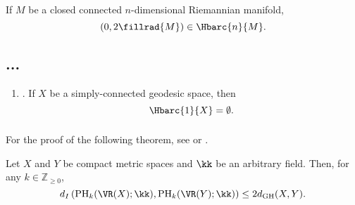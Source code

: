 \begin{proposition}\label{prop:manifold}
	If $M$ be a closed connected $n$-dimensional Riemannian manifold,
	\[
	(0,2\fillrad{M}) \in \Hbarc{n}{M}.
	\]
\end{proposition}

\subsection{...}

\begin{enumerate}

	\item\label{prop:pH1} {\rm \cite[Prop.~7.10]{virk20201}}.
	If $X$ be a simply-connected geodesic space, then
	\[
	\Hbarc{1}{X} = \emptyset.
	\]
\end{enumerate}

\subsubsection{} For the proof of the following theorem, see \cite{bib11} or \cite{bib13, bib14}.

\begin{theorem}
	Let $X$ and $Y$ be compact metric spaces and $\kk$ be an arbitrary field. Then, for any $k \in \mathbb{Z}_{\geq 0}$,
	\[
	d_I \left( \mathrm{PH}_k(\VR(X); \kk), \mathrm{PH}_k(\VR(Y); \kk) \right) \leq 2 d_{\mathrm{GH}}(X, Y).
	\]
\end{theorem}